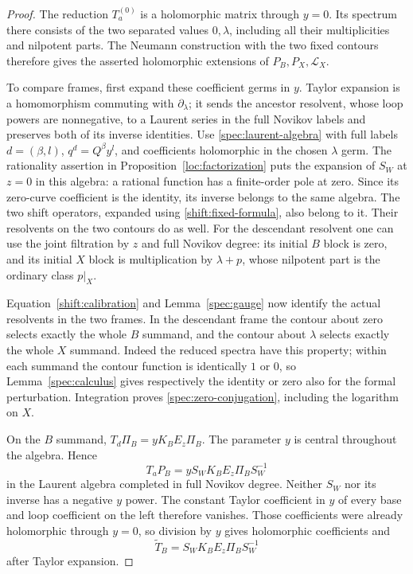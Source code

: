 \begin{proof}
The reduction $T_a^{(0)}$ is a holomorphic matrix through $y=0$.
Its spectrum there consists of the two separated values
$0,\lambda$, including all their multiplicities and nilpotent
parts.  The Neumann construction with the two fixed contours
therefore gives the asserted holomorphic extensions of
$P_B,P_X,\mathscr L_X$.

To compare frames, first expand these coefficient germs in $y$.
Taylor expansion is a homomorphism commuting with
$\partial_\lambda$; it sends the ancestor resolvent, whose loop
powers are nonnegative, to a Laurent series in the full Novikov labels and
preserves both of its inverse identities.
Use \eqref{spec:laurent-algebra} with full labels
$d=(\beta,l)$, $q^d=Q^\beta y^l$, and coefficients holomorphic
in the chosen $\lambda$ germ.  The rationality assertion in
Proposition~\ref{loc:factorization} puts the expansion of $S_W$ at
$z=0$ in this algebra: a rational function has a finite-order
pole at zero.  Since its zero-curve coefficient is the identity,
its inverse belongs to the same algebra.  The two shift
operators, expanded using \eqref{shift:fixed-formula}, also
belong to it.  Their resolvents on the two contours do as well.
For the descendant resolvent one can use the joint filtration
by $z$ and full Novikov degree: its initial $B$ block is zero,
and its initial $X$ block is multiplication by $\lambda+p$,
whose nilpotent part is the ordinary class $p|_X$.

Equation~\eqref{shift:calibration} and
Lemma~\ref{spec:gauge} now identify the actual resolvents in
the two frames.  In the descendant frame the contour about
zero selects exactly the whole $B$ summand, and the contour
about $\lambda$ selects exactly the whole $X$ summand.
Indeed the reduced spectra have this property; within each
summand the contour function is identically $1$ or $0$, so
Lemma~\ref{spec:calculus} gives respectively the identity or
zero also for the formal perturbation.  Integration proves
\eqref{spec:zero-conjugation}, including the logarithm on $X$.

On the $B$ summand, $T_d\Pi_B=yK_BE_z\Pi_B$.  The parameter
$y$ is central throughout the algebra.  Hence
\[
 T_aP_B
   =yS_WK_BE_z\Pi_BS_W^{-1}
\]
in the Laurent algebra completed in full Novikov degree.  Neither $S_W$ nor its
inverse has a negative $y$ power.  The constant Taylor
coefficient in $y$ of every base and loop coefficient on the
left therefore vanishes.  Those coefficients were already
holomorphic through $y=0$, so division by $y$ gives
holomorphic coefficients and
\begin{equation}
 \widetilde T_B=S_WK_BE_z\Pi_BS_W^{-1}
 \label{spec:divided-conjugation}
\end{equation}
after Taylor expansion.


\end{proof}
